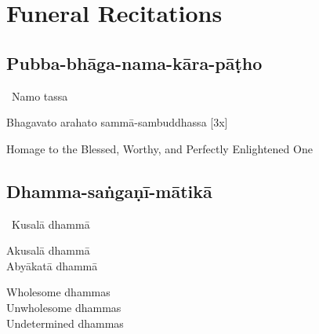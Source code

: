 \ifdesktopversion
{}
\else
{}
\fi

\chapter{Funeral Recitations}

\clearpage

\section{Pubba-bhāga-nama-kāra-pāṭho}
\label{pubba-bhaga-nama-kara-patho}

\begin{leader-only}
  \anglebracketleft\ \hspace{-0.5mm}Namo tassa \hspace{-0.5mm}\anglebracketright\
\end{leader-only}

\vspace{-0.99em}

Bhagavato arahato sammā-sambuddhassa \hfill{[3x]}

\begin{english}
  Homage to the Blessed, Worthy, and Perfectly Enlightened One
\end{english}

\vspace{1em}

\section{Dhamma-saṅgaṇī-mātikā}
\label{dhamma-sangani-matika}

\begin{leader-only}
  \anglebracketleft\ \hspace{-0.5mm}Kusalā dhammā \hspace{-0.5mm}\anglebracketright\
\end{leader-only}

\vspace{-0.99em}

\begin{pali-hang}
  Akusalā dhammā\\
  Abyākatā dhammā
\end{pali-hang}

\begin{english-verses}
  Wholesome dhammas\\
  Unwholesome dhammas\\
  Undetermined dhammas
\end{english-verses}

